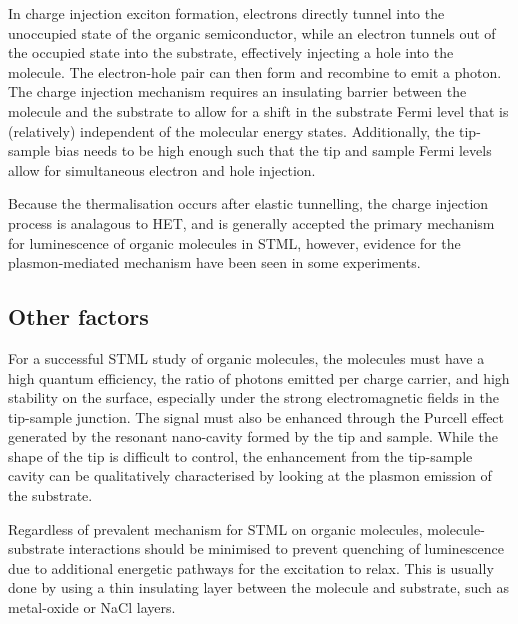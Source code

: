 In charge injection exciton formation, electrons directly tunnel into the unoccupied state of the organic semiconductor, while an electron tunnels out of the occupied state into the substrate, effectively injecting a hole into the molecule. The electron-hole pair can then form and recombine to emit a photon. The charge injection mechanism requires an insulating barrier between the molecule and the substrate to allow for a shift in the substrate Fermi level that is (relatively) independent of the molecular energy states. Additionally, the tip-sample bias needs to be high enough such that the tip and sample Fermi levels allow for simultaneous electron and hole injection.

Because the thermalisation occurs after elastic tunnelling, the charge injection process is analagous to \ac{HET}, and is generally accepted the primary mechanism for luminescence of organic molecules in \ac{STML}, however, evidence for the plasmon-mediated mechanism have been seen in some experiments.



\begin{figure} [h]
    \centering
    \caption{ }
    \label{fig:exptech:2-mechanisms}
\end{figure}



\subsection{Other factors}

For a successful \ac{STML} study of organic molecules, the molecules must have a high quantum efficiency, the ratio of photons emitted per charge carrier, and high stability on the surface, especially under the strong electromagnetic fields in the tip-sample junction. The signal must also be enhanced through the Purcell effect generated by the resonant nano-cavity formed by the tip and sample. While the shape of the tip is difficult to control, the enhancement from the tip-sample cavity can be qualitatively characterised by looking at the plasmon emission of the substrate. 

Regardless of prevalent mechanism for \ac{STML} on organic molecules, molecule-substrate interactions should be minimised to prevent quenching of luminescence due to additional energetic pathways for the excitation to relax. This is usually done by using a thin insulating layer between the molecule and substrate, such as metal-oxide or NaCl layers. 









